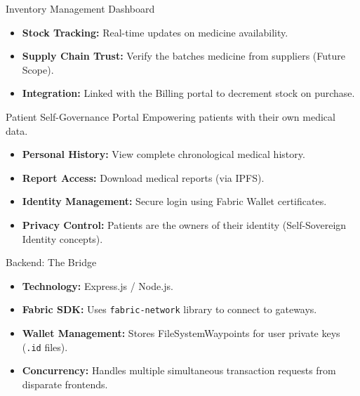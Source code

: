 \documentclass[10pt]{beamer}
\begin{document}
\begin{frame}{Inventory Management Dashboard}
    \begin{itemize}
        \item \textbf{Stock Tracking:} Real-time updates on medicine availability.
        \item \textbf{Supply Chain Trust:} Verify the batches medicine from suppliers (Future Scope).
        \item \textbf{Integration:} Linked with the Billing portal to decrement stock on purchase.
    \end{itemize}
    \vfill
    \begin{center}
    \end{center}
\end{frame}

\begin{frame}{Patient Self-Governance Portal}
    Empowering patients with their own medical data.
    \vfill
    \begin{itemize}
        \item \textbf{Personal History:} View complete chronological medical history.
        \item \textbf{Report Access:} Download medical reports (via IPFS).
        \item \textbf{Identity Management:} Secure login using Fabric Wallet certificates.
        \item \textbf{Privacy Control:} Patients are the owners of their identity (Self-Sovereign Identity concepts).
    \end{itemize}
\end{frame}

\begin{frame}{Backend: The Bridge}
    \begin{itemize}
        \item \textbf{Technology:} Express.js / Node.js.
        \item \textbf{Fabric SDK:} Uses \texttt{fabric-network} library to connect to gateways.
        \item \textbf{Wallet Management:} Stores FileSystemWaypoints for user private keys (\texttt{.id} files).
        \item \textbf{Concurrency:} Handles multiple simultaneous transaction requests from disparate frontends.
    \end{itemize}
\end{frame}
\end{document}
